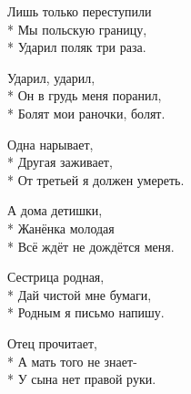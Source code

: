 \medskip

\begin{minipage}{\linewidth}
Лишь только переступили\\*
Мы польскую границу,\\*
Ударил поляк три раза.\\
\end{minipage}\par\medskip\nobreak

\medskip

\begin{minipage}{\linewidth}
Ударил, ударил,\\*
Он в грудь меня поранил,\\*
Болят мои раночки, болят.\\
\end{minipage}\par\medskip\nobreak

\medskip

\begin{minipage}{\linewidth}
Одна нарывает,\\*
Другая заживает,\\*
От третьей я должен умереть.\\
\end{minipage}\par\medskip\nobreak

\medskip

\begin{minipage}{\linewidth}
А дома детишки,\\*
Жанёнка молодая\\*
Всё ждёт не дождётся меня.\\
\end{minipage}\par\medskip\nobreak

\medskip

\begin{minipage}{\linewidth}
Сестрица родная,\\*
Дай чистой мне бумаги,\\*
Родным я письмо напишу.\\
\end{minipage}\par\medskip\nobreak

\medskip

\begin{minipage}{\linewidth}
Отец прочитает,\\*
А мать того не знает-\\*
У сына нет правой руки.\\
\end{minipage}\par\medskip\nobreak

